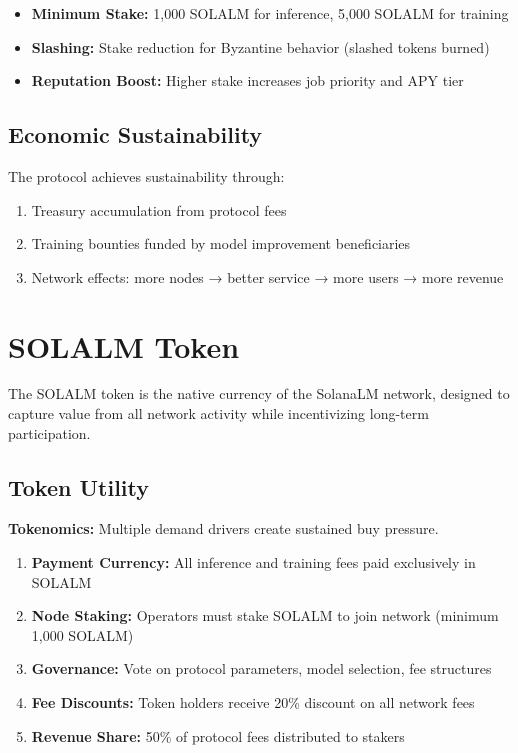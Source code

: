 \documentclass[11pt,a4paper]{article}
\begin{document}
\begin{itemize}
    \item \textbf{Minimum Stake:} 1,000 SOLALM for inference, 5,000 SOLALM for training
    \item \textbf{Slashing:} Stake reduction for Byzantine behavior (slashed tokens burned)
    \item \textbf{Reputation Boost:} Higher stake increases job priority and APY tier
\end{itemize}

\subsection{Economic Sustainability}

The protocol achieves sustainability through:

\begin{enumerate}
    \item Treasury accumulation from protocol fees
    \item Training bounties funded by model improvement beneficiaries
    \item Network effects: more nodes → better service → more users → more revenue
\end{enumerate}

\section{SOLALM Token}

The SOLALM token is the native currency of the SolanaLM network, designed to capture value from all network activity while incentivizing long-term participation.

\subsection{Token Utility}

\textbf{Tokenomics:} Multiple demand drivers create sustained buy pressure.

\begin{enumerate}
    \item \textbf{Payment Currency:} All inference and training fees paid exclusively in SOLALM
    \item \textbf{Node Staking:} Operators must stake SOLALM to join network (minimum 1,000 SOLALM)
    \item \textbf{Governance:} Vote on protocol parameters, model selection, fee structures
    \item \textbf{Fee Discounts:} Token holders receive 20\% discount on all network fees
    \item \textbf{Revenue Share:} 50\% of protocol fees distributed to stakers
\end{enumerate}
\end{document}
